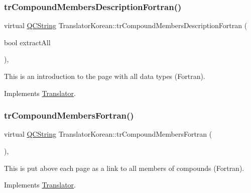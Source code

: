 \subsubsection{\texorpdfstring{trCompoundMembersDescriptionFortran()}{trCompoundMembersDescriptionFortran()}}
{\footnotesize\ttfamily virtual \mbox{\hyperlink{class_q_c_string}{Q\+C\+String}} Translator\+Korean\+::tr\+Compound\+Members\+Description\+Fortran (\begin{DoxyParamCaption}\item[{bool}]{extract\+All }\end{DoxyParamCaption})\hspace{0.3cm}{\ttfamily [inline]}, {\ttfamily [virtual]}}

This is an introduction to the page with all data types (Fortran). 

Implements \mbox{\hyperlink{class_translator}{Translator}}.

\mbox{\label{class_translator_korean_a3fc6d38e3bb16bef81009a67a76300ab}} 
\subsubsection{\texorpdfstring{trCompoundMembersFortran()}{trCompoundMembersFortran()}}
{\footnotesize\ttfamily virtual \mbox{\hyperlink{class_q_c_string}{Q\+C\+String}} Translator\+Korean\+::tr\+Compound\+Members\+Fortran (\begin{DoxyParamCaption}{ }\end{DoxyParamCaption})\hspace{0.3cm}{\ttfamily [inline]}, {\ttfamily [virtual]}}

This is put above each page as a link to all members of compounds (Fortran). 

Implements \mbox{\hyperlink{class_translator}{Translator}}.

\mbox{\label{class_translator_korean_ad86f35b0545b2f1e25c192c8978fa68e}} 
